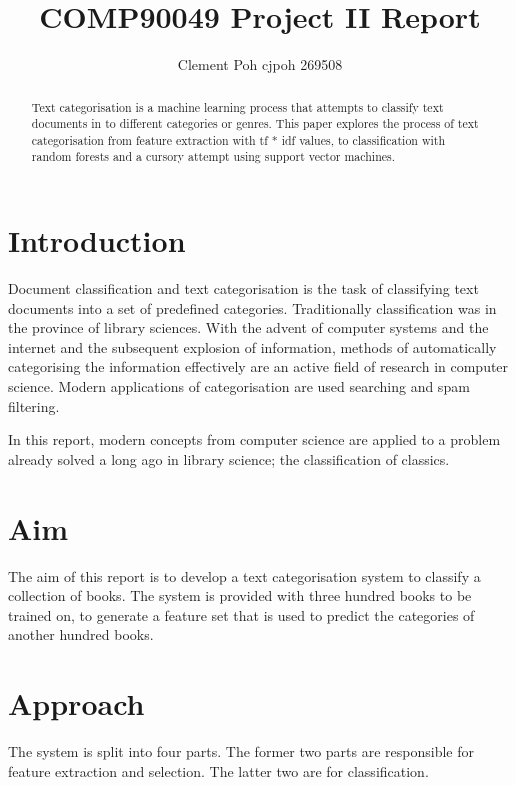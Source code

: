 \documentclass[11pt]{article}
\title{COMP90049 Project II Report}
\author{Clement Poh cjpoh 269508}
\begin{document}
\maketitle


\begin{abstract}

Text categorisation is a machine learning process that attempts to classify text
documents in to different categories or genres. This paper explores the process
of text categorisation from feature extraction with tf * idf values, to
classification with random forests and a cursory attempt using support vector
machines.

\end{abstract}


\section{Introduction}

Document classification and text categorisation is the task of classifying text
documents into a set of predefined categories. Traditionally classification was
in the province of library sciences. With the advent of computer systems and the
internet and the subsequent explosion of information, methods of automatically
categorising the information effectively are an active field of research in
computer science. Modern applications of categorisation are used searching and
spam filtering.

In this report, modern concepts from computer science are applied to a problem
already solved a long ago in library science; the classification of classics.

\section{Aim}

The aim of this report is to develop a text categorisation system to classify a
collection of books. The system is provided with three hundred books to be
trained on, to generate a feature set that is used to predict the categories of
another hundred books.

\section{Approach}

The system is split into four parts. The former two parts are responsible for
feature extraction and selection. The latter two are for classification.
\end{document}
